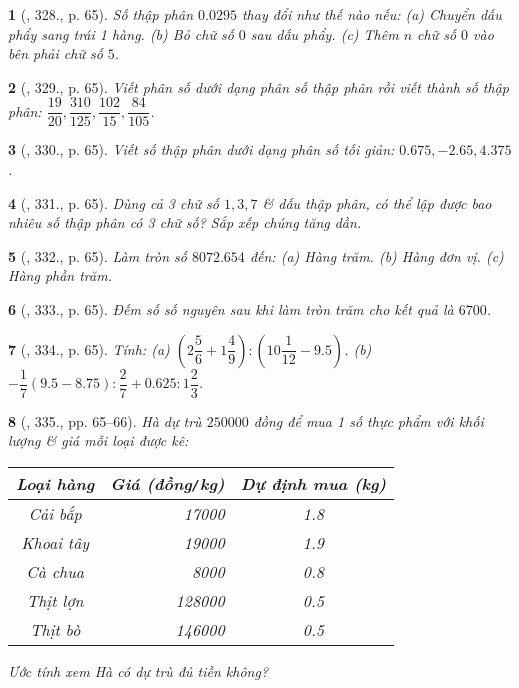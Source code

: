 \documentclass{article}
\newtheorem{baitoan}{}
\begin{document}
\begin{baitoan}[\cite{Tuyen_Toan_6}, 328., p. 65]
	Số thập phân $0.0295$ thay đổi như thế nào nếu: (a) Chuyển dấu phẩy sang trái 1 hàng. (b) Bỏ chữ số $0$ sau dấu phẩy. (c) Thêm $n$ chữ số $0$ vào bên phải chữ số $5$.
\end{baitoan}

\begin{baitoan}[\cite{Tuyen_Toan_6}, 329., p. 65]
	Viết phân số dưới dạng phân số thập phân rồi viết thành số thập phân: $\dfrac{19}{20},\dfrac{310}{125},\dfrac{102}{15},\dfrac{84}{105}$.
\end{baitoan}

\begin{baitoan}[\cite{Tuyen_Toan_6}, 330., p. 65]
	Viết số thập phân dưới dạng phân số tối giản: $0.675,-2.65,4.375$.
\end{baitoan}

\begin{baitoan}[\cite{Tuyen_Toan_6}, 331., p. 65]
	Dùng cả 3 chữ số $1,3,7$ \& dấu thập phân, có thể lập được bao nhiêu số thập phân có 3 chữ số? Sắp xếp chúng tăng dần.
\end{baitoan}

\begin{baitoan}[\cite{Tuyen_Toan_6}, 332., p. 65]
	Làm tròn số $8072.654$ đến: (a) Hàng trăm. (b) Hàng đơn vị. (c) Hàng phần trăm.
\end{baitoan}

\begin{baitoan}[\cite{Tuyen_Toan_6}, 333., p. 65]
	Đếm số số nguyên sau khi làm tròn trăm cho kết quả là $6700$.
\end{baitoan}

\begin{baitoan}[\cite{Tuyen_Toan_6}, 334., p. 65]
	Tính: (a) $\left(2\dfrac{5}{6} + 1\dfrac{4}{9}\right):\left(10\dfrac{1}{12} - 9.5\right)$. (b) $-\dfrac{1}{7}(9.5 - 8.75):\dfrac{2}{7} + 0.625:1\dfrac{2}{3}$.
\end{baitoan}

\begin{baitoan}[\cite{Tuyen_Toan_6}, 335., pp. 65--66]
	Hà dự trù $250000$ đồng để mua 1 số thực phẩm với khối lượng \& giá mỗi loại được kê:
	\begin{table}[H]
		\centering
		\begin{tabular}{|c|r|c|}
			\hline
			Loại hàng & Giá (đồng{\tt/}kg) & Dự định mua (kg) \\
			\hline
			Cải bắp & 17000 & 1.8 \\
			\hline
			Khoai tây & 19000 & 1.9 \\
			\hline
			Cà chua & 8000 & 0.8 \\
			\hline
			Thịt lợn & 128000 & 0.5 \\
			\hline
			Thịt bò & 146000 & 0.5 \\
			\hline
		\end{tabular}
	\end{table}
	Ước tính xem Hà có dự trù đủ tiền không?
\end{baitoan}
\end{document}
